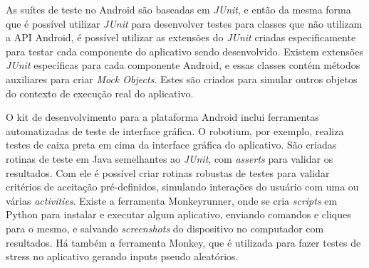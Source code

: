 \begin{apendicesenv}
As suítes de teste no Android são baseadas em \textit{JUnit}, e então da mesma forma que é possível utilizar \textit{JUnit} para desenvolver testes para classes que não utilizam a API Android, é possível utilizar as extensões do \textit{JUnit} criadas especificamente para testar cada componente do aplicativo sendo desenvolvido. Existem extensões \textit{JUnit} específicas para cada componente Android, e essas classes contém métodos auxiliares para criar \textit{Mock Objects}. Estes são criados para simular outros objetos do contexto de execução real do aplicativo.

O kit de desenvolvimento para a plataforma Android inclui ferramentas automatizadas de teste de interface gráfica. O robotium, por exemplo, realiza testes de caixa preta em cima da interface gráfica do aplicativo. São criadas rotinas de teste em Java semelhantes ao \textit{JUnit}, com \textit{asserts} para validar os resultados. Com ele é possível criar rotinas robustas de testes para validar critérios de aceitação pré-definidos, simulando interações do usuário com uma ou várias \textit{activities}. Existe a ferramenta Monkeyrunner, onde se cria \textit{scripts} em Python para instalar e executar algum aplicativo, enviando comandos e cliques para o mesmo, e salvando \textit{screenshots} do dispositivo no computador com resultados. Há também a ferramenta Monkey, que é utilizada para fazer testes de stress no aplicativo gerando inputs pseudo aleatórios.

\end{apendicesenv}
